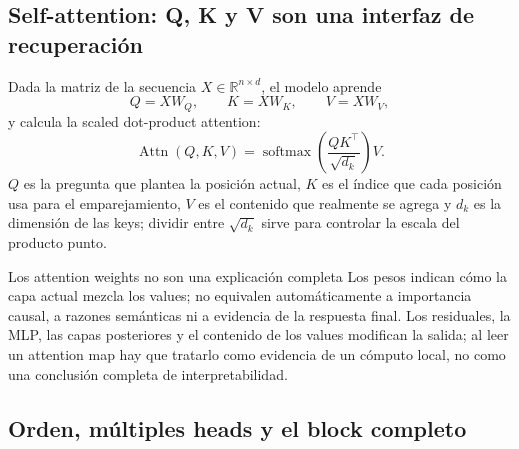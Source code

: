 \subsection{Self-attention: Q, K y V son una interfaz de recuperación}

Dada la matriz de la secuencia $X\in\mathbb{R}^{n\times d}$, el modelo aprende
\[
Q=XW_Q,\qquad K=XW_K,\qquad V=XW_V,
\]
y calcula la scaled dot-product attention:
\[
\operatorname{Attn}(Q,K,V)=\operatorname{softmax}\!\left(\frac{QK^{\top}}{\sqrt{d_k}}\right)V.
\]
$Q$ es la pregunta que plantea la posición actual, $K$ es el índice que cada posición usa para el emparejamiento, $V$ es el contenido que realmente se agrega y $d_k$ es la dimensión de las keys; dividir entre $\sqrt{d_k}$ sirve para controlar la escala del producto punto.






\begin{warningbox}{Los attention weights no son una explicación completa}
Los pesos indican cómo la capa actual mezcla los values; no equivalen automáticamente a importancia causal, a razones semánticas ni a evidencia de la respuesta final. Los residuales, la MLP, las capas posteriores y el contenido de los values modifican la salida; al leer un attention map hay que tratarlo como evidencia de un cómputo local, no como una conclusión completa de interpretabilidad.
\end{warningbox}



\subsection{Orden, múltiples heads y el block completo}

